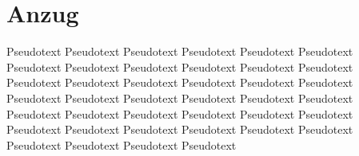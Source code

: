 \section{Anzug}
\label{kap:Anzug}
Pseudotext Pseudotext Pseudotext Pseudotext Pseudotext Pseudotext Pseudotext Pseudotext Pseudotext Pseudotext Pseudotext Pseudotext Pseudotext Pseudotext Pseudotext Pseudotext Pseudotext Pseudotext Pseudotext Pseudotext Pseudotext Pseudotext Pseudotext Pseudotext Pseudotext Pseudotext Pseudotext Pseudotext Pseudotext Pseudotext Pseudotext Pseudotext Pseudotext Pseudotext Pseudotext Pseudotext Pseudotext Pseudotext Pseudotext Pseudotext 





